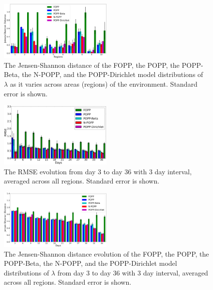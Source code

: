 \begin{figure}[t!]
	\centering
	\includegraphics[width=0.5\textwidth]{./figures/fopp_popp_popb_npop_popd_homo_kl.png}
	\caption{The Jensen-Shannon distance of the FOPP, the POPP, the POPP-Beta, the N-POPP, and the POPP-Dirichlet model distributions of $\lambda$ as it varies across areas (regions) of the environment. Standard error is shown.}
	\label{fig:fopp_popp_popb_npop_popd_homo_kl}
\end{figure}

\begin{figure}[t!]
	\centering
	\includegraphics[width=0.5\textwidth]{./figures/rmse_evolution_popp_dirichlet.png}
	\caption{The RMSE evolution from day 3 to day 36 with 3 day interval, averaged across all regions. Standard error is shown.}
	\label{fig:rmse_evolution_popp_dirichlet}
\end{figure}

\begin{figure}[t!]
	\centering
	\includegraphics[width=0.5\textwidth]{./figures/fopp_popp_popb_npop_popd_homo_kl_evo.png}
	\caption{The Jensen-Shannon distance evolution of the FOPP, the POPP, the POPP-Beta, the N-POPP, and the POPP-Dirichlet model distributions of $\lambda$ from day 3 to day 36 with 3 day interval, averaged across all regions. Standard error is shown.}
	\label{fig:fopp_popp_popb_npop_popd_homo_kl_evo}
\end{figure}
